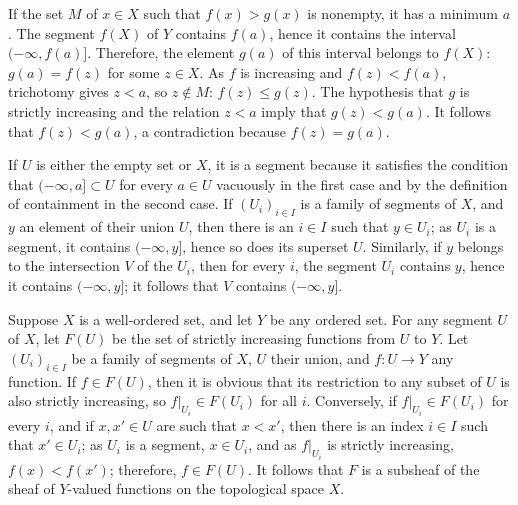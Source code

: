 \documentclass{article}
\begin{document}
\begin{solution}[\ref{exe:gsdhavsp}]
  \label{sol:ja6mjzt3}
  If the set \(M\) of \(x \in X\) such that \(f(x) > g(x)\) is
  nonempty, it has a minimum \(a\).  The segment \(f(X)\) of \(Y\)
  contains \(f(a)\), hence it contains the interval
  \((-\infty, f(a)]\).  Therefore, the element \(g(a)\) of this
  interval belongs to \(f(X)\): \(g(a) = f(z)\) for some \(z \in X\).
  As \(f\) is increasing and \(f(z) < f(a)\), trichotomy gives
  \(z < a\), so \(z \notin M\): \(f(z) \leq g(z)\).  The hypothesis
  that \(g\) is strictly increasing and the relation \(z < a\) imply
  that \(g(z) < g(a)\).  It follows that \(f(z) < g(a)\), a
  contradiction because \(f(z) = g(a)\).
\end{solution}

\begin{solution}[\ref{exe:rpm18mof}]
  \label{sol:aeu4zzog}
  If \(U\) is either the empty set or \(X\), it is a segment because
  it satisfies the condition that \((-\infty, a] \subset U\) for every
  \(a \in U\) vacuously in the first case and by the definition of
  containment in the second case.  If \((U_i)_{i \in I}\) is a family
  of segments of \(X\), and \(y\) an element of their union \(U\),
  then there is an \(i \in I\) such that \(y \in U_i\); as \(U_i\) is
  a segment, it contains \((-\infty, y]\), hence so does its superset
  \(U\).  Similarly, if \(y\) belongs to the intersection \(V\) of the
  \(U_i\), then for every \(i\), the segment \(U_i\) contains \(y\),
  hence it contains \((-\infty, y]\); it follows that \(V\) contains
  \((-\infty, y]\).

  Suppose \(X\) is a well-ordered set, and let \(Y\) be any ordered
  set.  For any segment \(U\) of \(X\), let \(F(U)\) be the set of
  strictly increasing functions from \(U\) to \(Y\).  Let
  \((U_i)_{i \in I}\) be a family of segments of \(X\), \(U\) their
  union, and \(f : U \to Y\) any function.  If \(f \in F(U)\), then it
  is obvious that its restriction to any subset of \(U\) is also
  strictly increasing, so \(f \vert_{U_i} \in F(U_i)\) for all \(i\).
  Conversely, if \(f \vert_{U_i} \in F(U_i)\) for every \(i\), and if
  \(x, x' \in U\) are such that \(x < x'\), then there is an index
  \(i \in I\) such that \(x' \in U_i\); as \(U_i\) is a segment,
  \(x \in U_i\), and as \(f \vert_{U_i}\) is strictly increasing,
  \(f(x) < f(x')\); therefore, \(f \in F(U)\).  It follows that \(F\)
  is a subsheaf of the sheaf of \(Y\)-valued functions on the
  topological space \(X\).


\end{solution}
\end{document}

